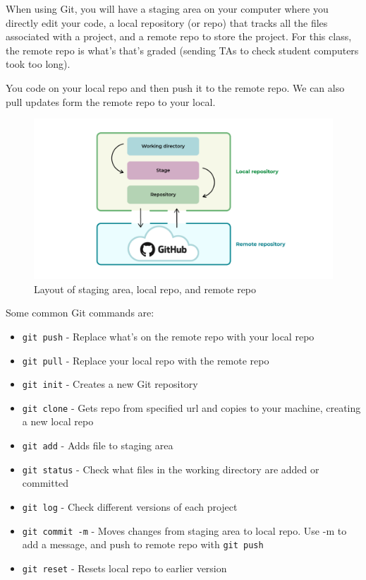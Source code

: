\documentclass[nobib]{tufte-handout}
\begin{document}

When using Git, you will have a staging area on your computer where
you directly edit your code, a local repository (or repo)
that tracks all the files associated with a project, and a remote repo
to store the project. For this class, the remote repo is what's
that's graded (sending TAs to check student computers took too long).

You code  on your local repo 
and then push it to the remote repo. We can also pull updates 
form the remote repo to your local.
\begin{figure}
   \centering
   \includegraphics{images/workingdir-stage-local-remote.png}
   \caption{Layout of staging area, local repo, and remote repo}
   \label{fig:wdstagelocalremote} 
\end{figure}


Some common Git commands are:
\begin{itemize}
   \item \texttt{git push} - Replace what's on the remote repo with your local repo
   \item \texttt{git pull} - Replace your local repo with the remote repo
   \item \texttt{git init} - Creates a new Git repository
   \item \texttt{git clone} - Gets repo from specified url and copies to your machine, creating a new local repo
   \item \texttt{git add} - Adds file to staging area
   \item \texttt{git status} - Check what files in the working directory
   are added or committed
   \item \texttt{git log} - Check different versions of each project
   \item \texttt{git commit -m} - Moves changes from staging area to local repo. Use -m to add a message, and push
   to remote repo with \texttt{git push}
   \item \texttt{git reset} - Resets local repo to earlier version
\end{itemize}
\end{document}
